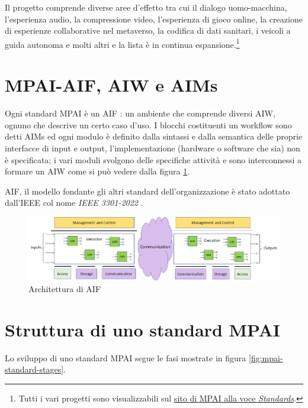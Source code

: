 Il progetto comprende diverse aree d'effetto tra cui il dialogo uomo-macchina, l'esperienza audio, la compressione video, l'esperienza di gioco online, la creazione di esperienze collaborative nel metaverso, la codifica di dati sanitari, i veicoli a guida autonoma e molti altri e la lista è in continua espansione.\footnote{Tutti i vari progetti sono visualizzabili sul \href{https://mpai.community/standards/}{sito di \ac{MPAI} alla voce \textit{Standards}}.}


\section{MPAI-AIF, \acs{AIW} e \acsp{AIM}} \label{sec:aif-aiw-aim}
Ogni standard \ac{MPAI} è un \ac{AIF} \cite{mpaiMPAIAIFMPAICommunity}: un ambiente che comprende diversi \ac{AIW}, ognuno che descrive un certo caso d'uso. I blocchi costituenti un workflow sono detti \acp{AIM} ed ogni modulo è definito dalla sintassi e dalla semantica delle proprie interfacce di input e output, l'implementazione (hardware o software che sia) non è specificata; i vari moduli svolgono delle specifiche attività e sono interconnessi a formare un AIW come si può vedere dalla figura \ref{fig:mpai-aif-architecture}.

\acs{AIF}, il modello fondante gli altri standard dell'organizzazione è stato adottato dall'\ac{IEEE} col nome \textit{IEEE 3301-2022} \cite{ieeeStandard3301-2022}.

\begin{figure}[h]
    \centering
    \includegraphics[width=\textwidth]{img/mpai-aif-architecture.png}
    \caption{Architettura di \acs{AIF} \cite{leonardoBlogNewWayDevelop2020}}
    \label{fig:mpai-aif-architecture}
\end{figure}


\section{Struttura di uno standard MPAI} \label{sec:standard-mpai} %
Lo sviluppo di uno standard MPAI segue le fasi mostrate in figura \ref{fig:mpai-standard-stages}.    %


